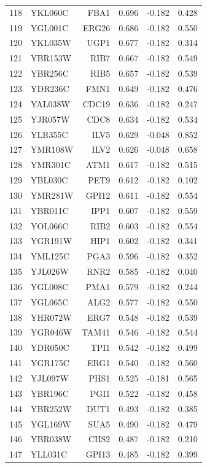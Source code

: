 \begin{longtable}{rlrrrr}
118 & YKL060C & FBA1 & 0.696 & -0.182 & 0.428\\
119 & YGL001C & ERG26 & 0.686 & -0.182 & 0.550\\
120 & YKL035W & UGP1 & 0.677 & -0.182 & 0.314\\
121 & YBR153W & RIB7 & 0.667 & -0.182 & 0.549\\
122 & YBR256C & RIB5 & 0.657 & -0.182 & 0.539\\
123 & YDR236C & FMN1 & 0.649 & -0.182 & 0.476\\
124 & YAL038W & CDC19 & 0.636 & -0.182 & 0.247\\
125 & YJR057W & CDC8 & 0.634 & -0.182 & 0.534\\
126 & YLR355C & ILV5 & 0.629 & -0.048 & 0.852\\
127 & YMR108W & ILV2 & 0.626 & -0.048 & 0.658\\
128 & YMR301C & ATM1 & 0.617 & -0.182 & 0.515\\
129 & YBL030C & PET9 & 0.612 & -0.182 & 0.102\\
130 & YMR281W & GPI12 & 0.611 & -0.182 & 0.554\\
131 & YBR011C & IPP1 & 0.607 & -0.182 & 0.559\\
132 & YOL066C & RIB2 & 0.603 & -0.182 & 0.554\\
133 & YGR191W & HIP1 & 0.602 & -0.182 & 0.341\\
134 & YML125C & PGA3 & 0.596 & -0.182 & 0.352\\
135 & YJL026W & RNR2 & 0.585 & -0.182 & 0.040\\
136 & YGL008C & PMA1 & 0.579 & -0.182 & 0.244\\
137 & YGL065C & ALG2 & 0.577 & -0.182 & 0.550\\
138 & YHR072W & ERG7 & 0.548 & -0.182 & 0.539\\
139 & YGR046W & TAM41 & 0.546 & -0.182 & 0.544\\
140 & YDR050C & TPI1 & 0.542 & -0.182 & 0.499\\
141 & YGR175C & ERG1 & 0.540 & -0.182 & 0.560\\
142 & YJL097W & PHS1 & 0.525 & -0.181 & 0.565\\
143 & YBR196C & PGI1 & 0.522 & -0.182 & 0.458\\
144 & YBR252W & DUT1 & 0.493 & -0.182 & 0.385\\
145 & YGL169W & SUA5 & 0.490 & -0.182 & 0.479\\
146 & YBR038W & CHS2 & 0.487 & -0.182 & 0.210\\
147 & YLL031C & GPI13 & 0.485 & -0.182 & 0.399\\

\end{longtable}
